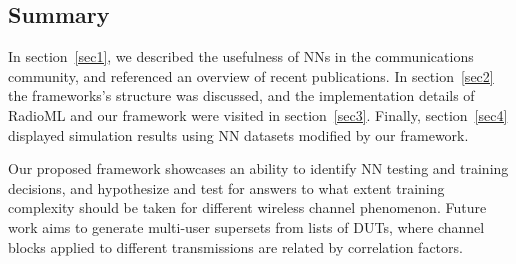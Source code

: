 \subsection{Summary}
\label{sec5}
In section~\ref{sec1}, we described the usefulness of NNs in the communications community, and referenced an overview of recent publications. In section~\ref{sec2} the frameworks's structure was discussed, and the implementation details of RadioML and our framework were visited in section~\ref{sec3}. Finally, section~\ref{sec4} displayed simulation results using NN datasets modified by our framework.

Our proposed framework showcases an ability to identify NN testing and training decisions, and hypothesize and test for answers to what extent training complexity should be taken for different wireless channel phenomenon. Future work aims to generate multi-user supersets from lists of DUTs, where channel blocks applied to different transmissions are related by correlation factors.
